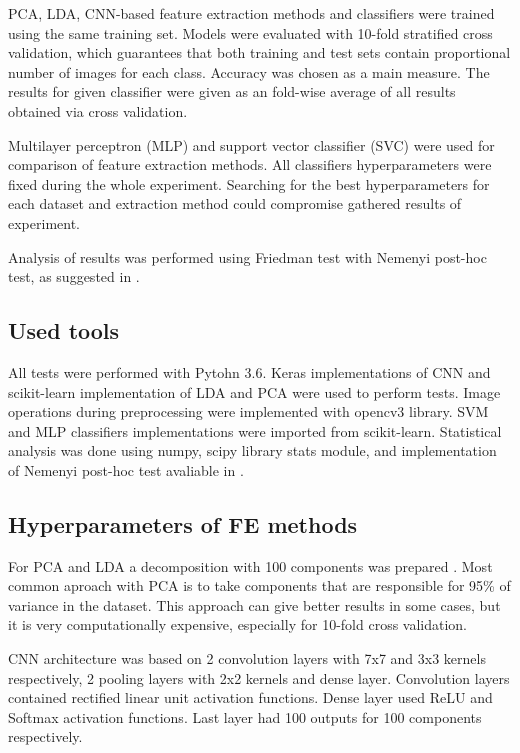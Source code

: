 \documentclass[a4paper, 10 pt, journal]{ieeeconf}
\begin{document}
PCA, LDA, CNN-based feature extraction methods and classifiers were trained using the same training set. Models were evaluated with 10-fold stratified cross validation, which guarantees that both training and test sets contain proportional number of images for each class. Accuracy was chosen as a main measure. The results for given classifier were given as an fold-wise average of all results obtained via cross validation.

Multilayer perceptron (MLP) and support vector classifier (SVC) were used for comparison of feature extraction methods. All classifiers hyperparameters were fixed during the whole experiment. Searching for the best hyperparameters for each dataset and extraction method could compromise gathered results of experiment.

Analysis of results was performed using Friedman test with Nemenyi post-hoc test, as suggested in \cite{demsar}.

\subsection{Used tools}

All tests were performed with Pytohn 3.6. Keras implementations of CNN and scikit-learn implementation of LDA and PCA were used to perform tests. Image operations during preprocessing were implemented with opencv3 library. SVM and MLP classifiers implementations were imported from scikit-learn. Statistical analysis was done using numpy, scipy library stats module, and implementation of Nemenyi post-hoc test avaliable in \cite{post_hoc_nemenyi}.

\subsection{Hyperparameters of FE methods}

For PCA and LDA a decomposition with 100 components was prepared . Most common aproach with PCA is to take components that are responsible for 95\% of variance in the dataset. This approach can give better results in some cases, but it is very computationally expensive, especially for 10-fold cross validation. 

CNN architecture was based on 2 convolution layers with 7x7 and 3x3 kernels respectively, 2 pooling layers with 2x2 kernels and dense layer. Convolution layers contained rectified linear unit  activation functions. Dense layer used ReLU and Softmax activation functions. Last layer had 100 outputs for 100 components respectively.
\end{document}
